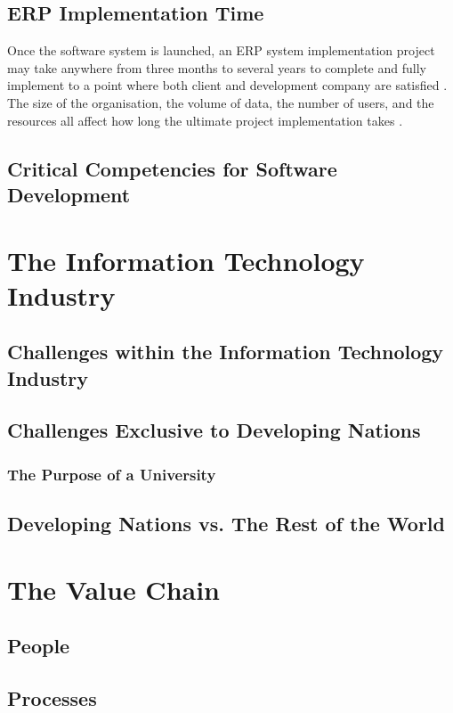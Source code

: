 \subsection{ERP Implementation Time}
\par{Once the software system is launched, an ERP system implementation project may take anywhere from three months to several years to complete and fully implement to a point where both client and development company are satisfied \citep{sankar2006implementation}. The size of the organisation, the volume of data, the number of users, and the resources all affect how long the ultimate project implementation takes \citep{pelphrey2015directing}.}
\subsection{Critical Competencies for Software Development}

\section{The Information Technology Industry}
\subsection{Challenges within the Information Technology Industry}
\subsection{Challenges Exclusive to Developing Nations}
\subsubsection{The Purpose of a University}
\subsection{Developing Nations vs. The Rest of the World}

\section{The Value Chain}
\subsection{People}
\subsection{Processes}
